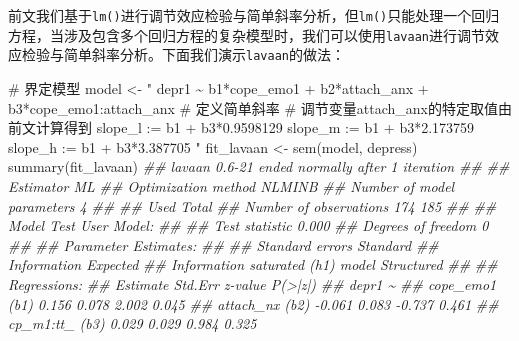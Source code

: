 \documentclass[
  chinese-hans,
  letterpaper,
  DIV=11,
  numbers=noendperiod]{scrartcl}
\newenvironment{Shaded}{\begin{snugshade}}{\end{snugshade}}
\newcommand{\CommentTok}[1]{\textcolor[rgb]{0.37,0.37,0.37}{#1}}
\newcommand{\DocumentationTok}[1]{\textcolor[rgb]{0.37,0.37,0.37}{\textit{#1}}}
\newcommand{\FunctionTok}[1]{\textcolor[rgb]{0.28,0.35,0.67}{#1}}
\newcommand{\NormalTok}[1]{\textcolor[rgb]{0.00,0.23,0.31}{#1}}
\newcommand{\OtherTok}[1]{\textcolor[rgb]{0.00,0.23,0.31}{#1}}
\newcommand{\StringTok}[1]{\textcolor[rgb]{0.13,0.47,0.30}{#1}}
\begin{document}
前文我们基于\texttt{lm()}进行调节效应检验与简单斜率分析，但\texttt{lm()}只能处理一个回归方程，当涉及包含多个回归方程的复杂模型时，我们可以使用\texttt{lavaan}进行调节效应检验与简单斜率分析。下面我们演示\texttt{lavaan}的做法：

\begin{Shaded}
\begin{Highlighting}[numbers=left,,]
\CommentTok{\# 界定模型}
\NormalTok{model }\OtherTok{\textless{}{-}} \StringTok{"}
\StringTok{depr1 \textasciitilde{} b1*cope\_emo1 + b2*attach\_anx + b3*cope\_emo1:attach\_anx}
\StringTok{\# 定义简单斜率}
\StringTok{\# 调节变量attach\_anx的特定取值由前文计算得到}
\StringTok{slope\_l := b1 + b3*0.9598129}
\StringTok{slope\_m := b1 + b3*2.173759}
\StringTok{slope\_h := b1 + b3*3.387705}
\StringTok{"}
\NormalTok{fit\_lavaan }\OtherTok{\textless{}{-}} \FunctionTok{sem}\NormalTok{(model, depress)}
\FunctionTok{summary}\NormalTok{(fit\_lavaan)}
\DocumentationTok{\#\# lavaan 0.6{-}21 ended normally after 1 iteration}
\DocumentationTok{\#\# }
\DocumentationTok{\#\#   Estimator                                         ML}
\DocumentationTok{\#\#   Optimization method                           NLMINB}
\DocumentationTok{\#\#   Number of model parameters                         4}
\DocumentationTok{\#\# }
\DocumentationTok{\#\#                                                   Used       Total}
\DocumentationTok{\#\#   Number of observations                           174         185}
\DocumentationTok{\#\# }
\DocumentationTok{\#\# Model Test User Model:}
\DocumentationTok{\#\#                                                       }
\DocumentationTok{\#\#   Test statistic                                 0.000}
\DocumentationTok{\#\#   Degrees of freedom                                 0}
\DocumentationTok{\#\# }
\DocumentationTok{\#\# Parameter Estimates:}
\DocumentationTok{\#\# }
\DocumentationTok{\#\#   Standard errors                             Standard}
\DocumentationTok{\#\#   Information                                 Expected}
\DocumentationTok{\#\#   Information saturated (h1) model          Structured}
\DocumentationTok{\#\# }
\DocumentationTok{\#\# Regressions:}
\DocumentationTok{\#\#                    Estimate  Std.Err  z{-}value  P(\textgreater{}|z|)}
\DocumentationTok{\#\#   depr1 \textasciitilde{}                                             }
\DocumentationTok{\#\#     cope\_emo1 (b1)    0.156    0.078    2.002    0.045}
\DocumentationTok{\#\#     attach\_nx (b2)   {-}0.061    0.083   {-}0.737    0.461}
\DocumentationTok{\#\#     cp\_m1:tt\_ (b3)    0.029    0.029    0.984    0.325}

\end{Highlighting}
\end{Shaded}
\end{document}
